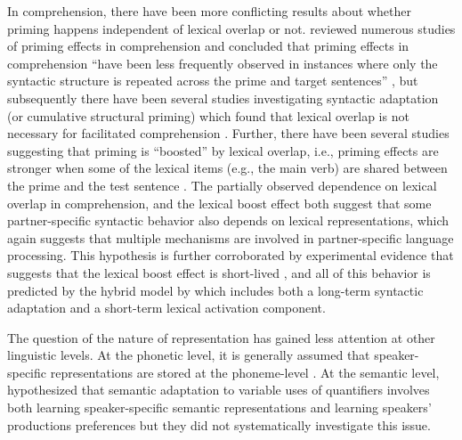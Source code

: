 In comprehension, there have been more conflicting results about whether priming happens independent of lexical overlap or not.
\textcite{Tooley2010} reviewed numerous studies of priming effects in comprehension and concluded that priming effects in comprehension
 ``have been less frequently observed in instances where only the syntactic structure is repeated across the prime and target sentences'' \cite[][p.928]{Tooley2010},
but subsequently there have been several studies investigating syntactic adaptation (or cumulative structural priming) which found that lexical overlap is not
necessary for facilitated comprehension . Further, there have been several studies suggesting that priming is 
``boosted'' by lexical overlap, i.e., priming effects are stronger when some of the lexical items
(e.g.,  the main verb) are shared between the prime and the test sentence 
.
The partially observed dependence
on lexical overlap in comprehension, and the lexical boost effect both suggest that some partner-specific syntactic behavior also depends on 
lexical representations, which again suggests that multiple mechanisms are involved in partner-specific language processing. This hypothesis
is further corroborated by experimental evidence that suggests that the lexical boost effect is short-lived , and all
of this behavior is predicted by the hybrid model by \textcite{Reitter2011} which includes both a long-term syntactic adaptation and a short-term
lexical activation component.

The question of the nature of representation has gained less attention at other linguistic levels. At the phonetic level, it is generally assumed
that speaker-specific representations are stored at the phoneme-level . At the semantic level, \textcite{Yildirim2016}
hypothesized that semantic adaptation to variable uses of quantifiers  involves both learning speaker-specific semantic representations
and learning speakers' productions preferences but they did not systematically investigate this issue. 

